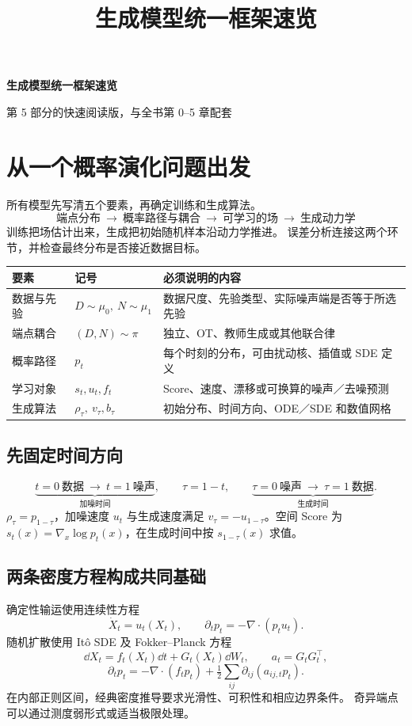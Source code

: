 \documentclass[language=chinese,margin=right,11pt]{lumenbook}
\title{生成模型统一框架速览}
\author{}
\date{}
\begin{document}
\begin{center}
{\LARGE\bfseries 生成模型统一框架速览}\par
{\small 第 5 部分的快速阅读版，与全书第 0--5 章配套}
\end{center}

\section*{从一个概率演化问题出发}

所有模型先写清五个要素，再确定训练和生成算法。
\[
 \boxed{\text{端点分布}\ \longrightarrow\ \text{概率路径与耦合}
 \ \longrightarrow\ \text{可学习的场}\ \longrightarrow\ \text{生成动力学}}
\]
训练把场估计出来，生成把初始随机样本沿动力学推进。
误差分析连接这两个环节，并检查最终分布是否接近数据目标。

\par\noindent
\begin{tabularx}{\textwidth}{@{}llX@{}}
\toprule
要素 & 记号 & 必须说明的内容 \\
\midrule
数据与先验 & \(D\sim\mu_0,\ N\sim\mu_1\) & 数据尺度、先验类型、实际噪声端是否等于所选先验 \\
端点耦合 & \((D,N)\sim\pi\) & 独立、OT、教师生成或其他联合律 \\
概率路径 & \(p_t\) & 每个时刻的分布，可由扰动核、插值或 SDE 定义 \\
学习对象 & \(s_t,u_t,f_t\) & Score、速度、漂移或可换算的噪声／去噪预测 \\
生成算法 & \(\rho_\tau,\ v_\tau,b_\tau\) & 初始分布、时间方向、ODE／SDE 和数值网格 \\
\bottomrule
\end{tabularx}

\subsection*{先固定时间方向}
\[
 \underbrace{t=0\ \text{数据}\ \longrightarrow\ t=1\ \text{噪声}}_{\text{加噪时间}},
 \qquad \tau=1-t,\qquad
 \underbrace{\tau=0\ \text{噪声}\ \longrightarrow\ \tau=1\ \text{数据}}_{\text{生成时间}}.
\]
\(\rho_\tau=p_{1-\tau}\)，加噪速度 \(u_t\) 与生成速度满足
\(v_\tau=-u_{1-\tau}\)。空间 Score 为
\(s_t(x)=\nabla_x\log p_t(x)\)，在生成时间中按 \(s_{1-\tau}(x)\) 求值。

\subsection*{两条密度方程构成共同基础}
确定性输运使用连续性方程
\[
 \dot X_t=u_t(X_t),\qquad \partial_t p_t=-\nabla\cdot(p_tu_t).
\]
随机扩散使用 It\^o SDE 及 Fokker--Planck 方程
\[
 \dd X_t=f_t(X_t)\dd t+G_t(X_t)\dd W_t,\qquad a_t=G_tG_t^\top,
\]
\[
 \partial_t p_t=-\nabla\cdot(f_tp_t)+\tfrac12\sum_{ij}\partial_{ij}(a_{ij,t}p_t).
\]
在内部正则区间，经典密度推导要求光滑性、可积性和相应边界条件。
奇异端点可以通过测度弱形式或适当极限处理。
\end{document}
